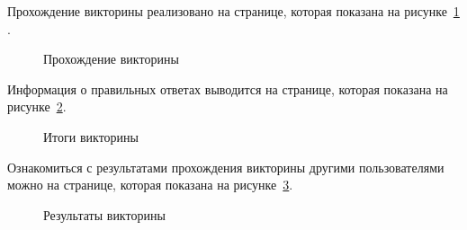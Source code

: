 \documentclass[14pt]{extarticle} %
\begin{document}
Прохождение викторины реализовано на странице, которая показана на рисунке~\ref{quiz1} .
\begin{figure}[!ht]
	\centering
	\caption{Прохождение викторины}
	\label{quiz1}
\end{figure}

Информация о правильных ответах выводится на странице, которая показана на рисунке~\ref{quiz2}.
\begin{figure}[!ht]
	\centering
	\caption{Итоги викторины}
	\label{quiz2}
\end{figure}


\newpage
Ознакомиться с результатами прохождения викторины другими пользователями можно на странице, которая показана на рисунке~\ref{result}.
\begin{figure}[!ht]
	\centering
	\caption{Результаты викторины}
	\label{result}
\end{figure}
\end{document}
